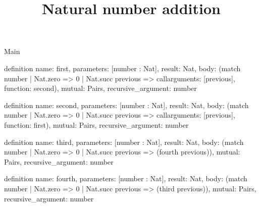 \begin{lexlean}{Main}
\title{Natural number addition}
\begin{semanticmodule}
definition{
  name: first,
  parameters: [number : Nat],
  result: Nat,
  body: (match number
    | Nat.zero => 0
    | Nat.succ previous => call{arguments: [previous], function: second}),
  mutual: Pairs,
  recursive_argument: number
}

definition{
  name: second,
  parameters: [number : Nat],
  result: Nat,
  body: (match number
    | Nat.zero => 0
    | Nat.succ previous => call{arguments: [previous], function: first}),
  mutual: Pairs,
  recursive_argument: number
}

definition{
  name: third,
  parameters: [number : Nat],
  result: Nat,
  body: (match number | Nat.zero => 0 | Nat.succ previous => (fourth previous)),
  mutual: Pairs,
  recursive_argument: number
}

definition{
  name: fourth,
  parameters: [number : Nat],
  result: Nat,
  body: (match number | Nat.zero => 0 | Nat.succ previous => (third previous)),
  mutual: Pairs,
  recursive_argument: number
}
\end{semanticmodule}
\end{lexlean}
